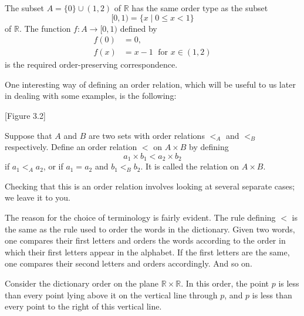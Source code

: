 \begin{centeredblock*}
 \begin{example}
\label{ex:\thesection.\theexample}
 The subset \(A = \{ 0\} \cup ({1,2})\) of \(\mathbb{R}\) has the same order type as the subset
 \[
 \lbrack 0,1) = \{ x \mid 0 \leq x < 1\}
 \]
 of \(\mathbb{R}\). The function \(f : A \rightarrow \lbrack 0,1)\) defined by
 \[
 \begin{aligned}
 f( 0) &= 0, \\
 f(x) &= x - 1\;\text{ for }x \in ({1,2})
 \end{aligned}
 \]
 is the required order-preserving correspondence.
 \end{example}
\end{centeredblock*}

One interesting way of defining an order relation, which will be useful to us later in dealing with some examples, is the following:

[Figure 3.2]

\begin{definition}
 Suppose that \(A\) and \(B\) are two sets with order relations \({ < }_{A}\) and \({ < }_{B}\) respectively. Define an order relation \(<\) on \(A \times B\) by defining
 \[
 a_{1} \times {b}_{1} < a_{2} \times {b}_{2}
 \]
 if \(a_{1}{ < }_{A}a_{2}\), or if \(a_{1} = a_{2}\) and \(b_{1}{ < }_{B}b_{2}\). It is called the  relation on \(A \times B\).
\end{definition}

Checking that this is an order relation involves looking at several separate cases; we leave it to you.

The reason for the choice of terminology is fairly evident. The rule defining \(<\) is the same as the rule used to order the words in the dictionary. Given two words, one compares their first letters and orders the words according to the order in which their first letters appear in the alphabet. If the first letters are the same, one compares their second letters and orders accordingly. And so on.

\begin{centeredblock}
 \begin{example}
\label{ex:\thesection.\theexample}
 Consider the dictionary order on the plane \(\mathbb{R} \times \mathbb{R}\). In this order, the point \(p\) is less than every point lying above it on the vertical line through \(p\), and \(p\) is less than every point to the right of this vertical line.
 \end{example}
\end{centeredblock}

